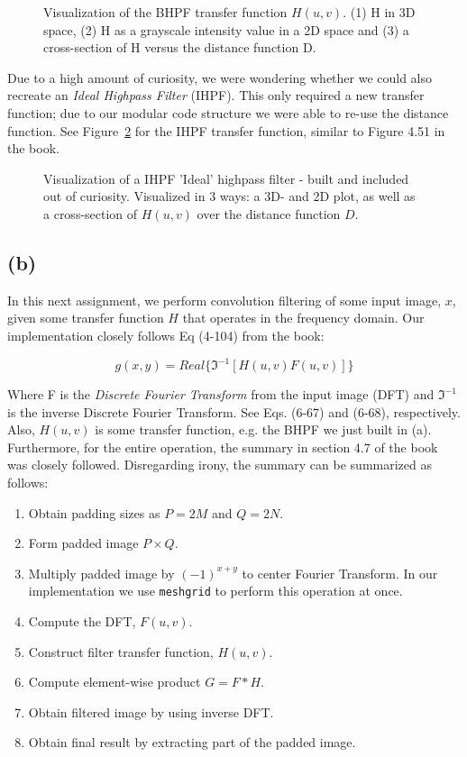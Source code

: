 \documentclass{article}
\begin{document}
\begin{figure}[ht]
    \centering
    
    \caption{Visualization of the BHPF transfer function $H(u, v)$. (1) H in 3D space, (2) H as a grayscale intensity value in a 2D space and (3) a cross-section of H versus the distance function D.}
    \label{fig:bhpf}
\end{figure}

Due to a high amount of curiosity, we were wondering whether we could also recreate an \textit{Ideal Highpass Filter} (IHPF). This only required a new transfer function; due to our modular code structure we were able to re-use the distance function. See Figure~\ref{fig:ihpf} for the IHPF transfer function, similar to Figure 4.51 in the book.

\begin{figure}[ht]
    \centering
    
    \caption{Visualization of a IHPF 'Ideal' highpass filter - built and included out of curiosity. Visualized in 3 ways: a 3D- and 2D plot, as well as a cross-section of $H(u, v)$ over the distance function $D$.}
    \label{fig:ihpf}
\end{figure}

\subsection*{(b)} In this next assignment, we perform convolution filtering of some input image, $x$, given some transfer function $H$ that operates in the frequency domain. Our implementation closely follows Eq (4-104) from the book:

\[
g(x, y) = Real\{\Im^{-1}[H(u,v)F(u, v)]\}
\]

Where F is the \textit{Discrete Fourier Transform} from the input image (DFT) and $\Im^{-1}$ is the inverse Discrete Fourier Transform. See Eqs. (6-67) and (6-68), respectively. Also, $H(u, v)$ is some transfer function, e.g. the BHPF we just built in (a). Furthermore, for the entire operation, the summary in section 4.7 of the book was closely followed. Disregarding irony, the summary can be summarized as follows:

\begin{enumerate}
    \item Obtain padding sizes as $P = 2M$ and $Q = 2N$.
    \item Form padded image $P \times Q$.
    \item Multiply padded image by $(-1)^{x+y}$ to center Fourier Transform. In our implementation we use \texttt{meshgrid} to perform this operation at once.
    \item Compute the DFT, $F(u, v)$.
    \item Construct filter transfer function, $H(u, v)$.
    \item Compute element-wise product $G = F * H$.
    \item Obtain filtered image by using inverse DFT.
    \item Obtain final result by extracting part of the padded image.
\end{enumerate}
\end{document}

